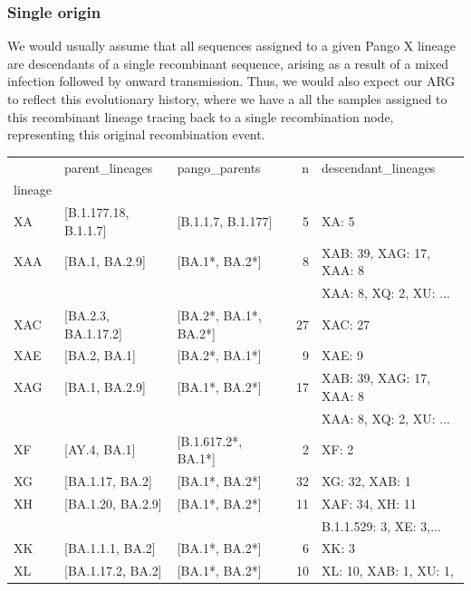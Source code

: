 \documentclass{article}
\begin{document}
\subsubsection{Single origin}
We would usually assume that all sequences
assigned to a given Pango X lineage are descendants of a single recombinant
sequence, arising as a result of a mixed infection followed by onward
transmission. Thus, we would also expect our ARG to reflect this evolutionary
history, where we have a all the samples assigned to this recombinant lineage
tracing back to a single recombination node, representing this original
recombination event.

\begin{table}
\begin{tabular}{lllrl}
\toprule
{} &              parent\_lineages &          pango\_parents &   n &
descendant\_lineages \\
lineage &                              &                        &     &
\\
\midrule
XA      &        [B.1.177.18, B.1.1.7] &     [B.1.1.7, B.1.177] &   5 & XA: 5 \\
XAA     &               [BA.1, BA.2.9] &         [BA.1*, BA.2*] &   8 &
    XAB: 39, XAG: 17, XAA: 8 \\
    &&&&   XAA: 8, XQ: 2, XU: ... \\
XAC     &          [BA.2.3, BA.1.17.2] &  [BA.2*, BA.1*, BA.2*] &  27 & XAC: 27 \\
XAE     &                 [BA.2, BA.1] &         [BA.2*, BA.1*] &   9 & XAE: 9 \\
XAG     &               [BA.1, BA.2.9] &         [BA.1*, BA.2*] &  17 &
    XAB: 39, XAG: 17, XAA: 8 \\
    &&&&   XAA: 8, XQ: 2, XU: ... \\
XF      &                 [AY.4, BA.1] &    [B.1.617.2*, BA.1*] &   2 & XF: 2 \\
XG      &              [BA.1.17, BA.2] &         [BA.1*, BA.2*] &  32 & XG: 32, XAB: 1 \\
XH      &            [BA.1.20, BA.2.9] &         [BA.1*, BA.2*] &  11 &
    XAF: 34, XH: 11 \\
&&&& B.1.1.529: 3, XE: 3,... \\
XK      &             [BA.1.1.1, BA.2] &         [BA.1*, BA.2*] &   6 & XK: 3 \\
XL      &            [BA.1.17.2, BA.2] &         [BA.1*, BA.2*] &  10 &
    XL: 10, XAB: 1, XU: 1, \\

\end{tabular}
\end{table}
\end{document}
